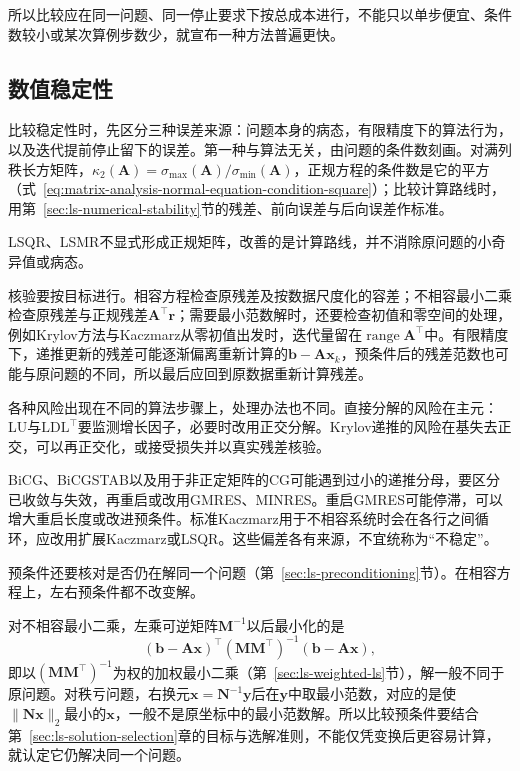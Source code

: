 所以比较应在同一问题、同一停止要求下按总成本进行，不能只以单步便宜、条件数较小或某次算例步数少，就宣布一种方法普遍更快。

\subsection{数值稳定性}
\label{sec:ls-method-selection-stability}

比较稳定性时，先区分三种误差来源：问题本身的病态，有限精度下的算法行为，以及迭代提前停止留下的误差。第一种与算法无关，由问题的条件数刻画。对满列秩长方矩阵，$\kappa_2(\bm A)=\sigma_{\max}(\bm A)/\sigma_{\min}(\bm A)$，正规方程的条件数是它的平方（式~\eqref{eq:matrix-analysis-normal-equation-condition-square}）；比较计算路线时，用第~\ref{sec:ls-numerical-stability}节的残差、前向误差与后向误差作标准。

LSQR、LSMR不显式形成正规矩阵，改善的是计算路线，并不消除原问题的小奇异值或病态。

核验要按目标进行。相容方程检查原残差及按数据尺度化的容差；不相容最小二乘检查原残差与正规残差$\bm A^\top\bm r$；需要最小范数解时，还要检查初值和零空间的处理，例如Krylov方法与Kaczmarz从零初值出发时，迭代量留在$\operatorname{range}\bm A^\top$中。有限精度下，递推更新的残差可能逐渐偏离重新计算的$\bm b-\bm A\bm x_k$，预条件后的残差范数也可能与原问题的不同，所以最后应回到原数据重新计算残差。

各种风险出现在不同的算法步骤上，处理办法也不同。直接分解的风险在主元：LU与$\mathrm{LDL}^\top$要监测增长因子，必要时改用正交分解。Krylov递推的风险在基失去正交，可以再正交化，或接受损失并以真实残差核验。

BiCG、BiCGSTAB以及用于非正定矩阵的CG可能遇到过小的递推分母，要区分已收敛与失效，再重启或改用GMRES、MINRES。重启GMRES可能停滞，可以增大重启长度或改进预条件。标准Kaczmarz用于不相容系统时会在各行之间循环，应改用扩展Kaczmarz或LSQR。这些偏差各有来源，不宜统称为“不稳定”。

预条件还要核对是否仍在解同一个问题（第~\ref{sec:ls-preconditioning}节）。在相容方程上，左右预条件都不改变解。

对不相容最小二乘，左乘可逆矩阵$\bm M^{-1}$以后最小化的是
\[
 (\bm b-\bm A\bm x)^\top(\bm M\bm M^\top)^{-1}(\bm b-\bm A\bm x),
\]
即以$(\bm M\bm M^\top)^{-1}$为权的加权最小二乘（第~\ref{sec:ls-weighted-ls}节），解一般不同于原问题。对秩亏问题，右换元$\bm x=\bm N^{-1}\bm y$后在$\bm y$中取最小范数，对应的是使$\lVert\bm N\bm x\rVert_2$最小的$\bm x$，一般不是原坐标中的最小范数解。所以比较预条件要结合第~\ref{sec:ls-solution-selection}章的目标与选解准则，不能仅凭变换后更容易计算，就认定它仍解决同一个问题。


